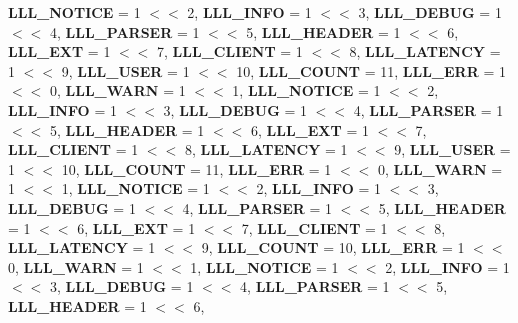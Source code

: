 \begin{DoxyCompactItemize}
{\bfseries L\+L\+L\+\_\+\+N\+O\+T\+I\+CE} = 1 $<$$<$ 2, 
{\bfseries L\+L\+L\+\_\+\+I\+N\+FO} = 1 $<$$<$ 3, 
{\bfseries L\+L\+L\+\_\+\+D\+E\+B\+UG} = 1 $<$$<$ 4, 
\newline
{\bfseries L\+L\+L\+\_\+\+P\+A\+R\+S\+ER} = 1 $<$$<$ 5, 
{\bfseries L\+L\+L\+\_\+\+H\+E\+A\+D\+ER} = 1 $<$$<$ 6, 
{\bfseries L\+L\+L\+\_\+\+E\+XT} = 1 $<$$<$ 7, 
{\bfseries L\+L\+L\+\_\+\+C\+L\+I\+E\+NT} = 1 $<$$<$ 8, 
\newline
{\bfseries L\+L\+L\+\_\+\+L\+A\+T\+E\+N\+CY} = 1 $<$$<$ 9, 
{\bfseries L\+L\+L\+\_\+\+U\+S\+ER} = 1 $<$$<$ 10, 
{\bfseries L\+L\+L\+\_\+\+C\+O\+U\+NT} = 11, 
{\bfseries L\+L\+L\+\_\+\+E\+RR} = 1 $<$$<$ 0, 
\newline
{\bfseries L\+L\+L\+\_\+\+W\+A\+RN} = 1 $<$$<$ 1, 
{\bfseries L\+L\+L\+\_\+\+N\+O\+T\+I\+CE} = 1 $<$$<$ 2, 
{\bfseries L\+L\+L\+\_\+\+I\+N\+FO} = 1 $<$$<$ 3, 
{\bfseries L\+L\+L\+\_\+\+D\+E\+B\+UG} = 1 $<$$<$ 4, 
\newline
{\bfseries L\+L\+L\+\_\+\+P\+A\+R\+S\+ER} = 1 $<$$<$ 5, 
{\bfseries L\+L\+L\+\_\+\+H\+E\+A\+D\+ER} = 1 $<$$<$ 6, 
{\bfseries L\+L\+L\+\_\+\+E\+XT} = 1 $<$$<$ 7, 
{\bfseries L\+L\+L\+\_\+\+C\+L\+I\+E\+NT} = 1 $<$$<$ 8, 
\newline
{\bfseries L\+L\+L\+\_\+\+L\+A\+T\+E\+N\+CY} = 1 $<$$<$ 9, 
{\bfseries L\+L\+L\+\_\+\+U\+S\+ER} = 1 $<$$<$ 10, 
{\bfseries L\+L\+L\+\_\+\+C\+O\+U\+NT} = 11, 
{\bfseries L\+L\+L\+\_\+\+E\+RR} = 1 $<$$<$ 0, 
\newline
{\bfseries L\+L\+L\+\_\+\+W\+A\+RN} = 1 $<$$<$ 1, 
{\bfseries L\+L\+L\+\_\+\+N\+O\+T\+I\+CE} = 1 $<$$<$ 2, 
{\bfseries L\+L\+L\+\_\+\+I\+N\+FO} = 1 $<$$<$ 3, 
{\bfseries L\+L\+L\+\_\+\+D\+E\+B\+UG} = 1 $<$$<$ 4, 
\newline
{\bfseries L\+L\+L\+\_\+\+P\+A\+R\+S\+ER} = 1 $<$$<$ 5, 
{\bfseries L\+L\+L\+\_\+\+H\+E\+A\+D\+ER} = 1 $<$$<$ 6, 
{\bfseries L\+L\+L\+\_\+\+E\+XT} = 1 $<$$<$ 7, 
{\bfseries L\+L\+L\+\_\+\+C\+L\+I\+E\+NT} = 1 $<$$<$ 8, 
\newline
{\bfseries L\+L\+L\+\_\+\+L\+A\+T\+E\+N\+CY} = 1 $<$$<$ 9, 
{\bfseries L\+L\+L\+\_\+\+C\+O\+U\+NT} = 10, 
{\bfseries L\+L\+L\+\_\+\+E\+RR} = 1 $<$$<$ 0, 
{\bfseries L\+L\+L\+\_\+\+W\+A\+RN} = 1 $<$$<$ 1, 
\newline
{\bfseries L\+L\+L\+\_\+\+N\+O\+T\+I\+CE} = 1 $<$$<$ 2, 
{\bfseries L\+L\+L\+\_\+\+I\+N\+FO} = 1 $<$$<$ 3, 
{\bfseries L\+L\+L\+\_\+\+D\+E\+B\+UG} = 1 $<$$<$ 4, 
{\bfseries L\+L\+L\+\_\+\+P\+A\+R\+S\+ER} = 1 $<$$<$ 5, 
\newline
{\bfseries L\+L\+L\+\_\+\+H\+E\+A\+D\+ER} = 1 $<$$<$ 6, 
$$
\end{DoxyCompactItemize}
